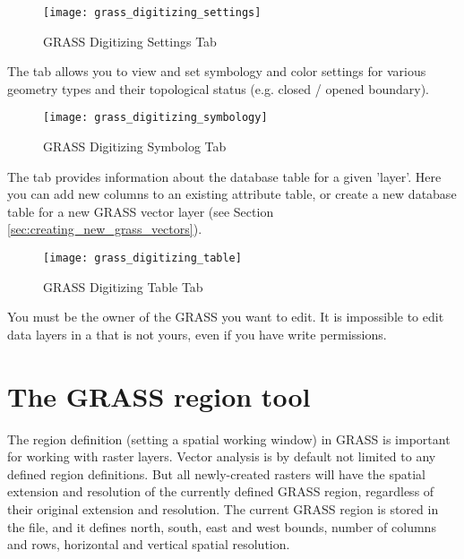 \begin{figure}[h]
 \centering
 \texttt{[image: grass\_digitizing\_settings]}
 \caption{GRASS Digitizing Settings Tab \nixcaption}\label{fig:grass_digitizing_settings}
\end{figure}


The  tab allows you to view and set symbology and color
settings for various geometry types and their topological status (e.g. closed
/ opened boundary).

\begin{figure}[h]
 \centering
 \texttt{[image: grass\_digitizing\_symbology]}
 \caption{GRASS Digitizing Symbolog Tab \nixcaption}\label{fig:grass_digitizing_symbology}
\end{figure}

 

The  tab provides information about the database table for
a given 'layer'. Here you can add new columns to an existing attribute table,
or create a new database table for a new GRASS vector layer (see Section 
\ref{sec:creating_new_grass_vectors}).

\begin{figure}[h]
 \centering
 \texttt{[image: grass\_digitizing\_table]}
 \caption{GRASS Digitizing Table Tab \nixcaption}\label{fig:grass_digitizing_table}
 \end{figure}

\begin{Tip}\caption{\textsc{GRASS Edit Permissions}}
You must be the owner of the GRASS  you want to 
edit. It is impossible to edit data layers in a  that is not 
yours, even if you have write permissions.
\end{Tip} 

\section{The GRASS region tool}\label{sec:grass_region}

The region definition (setting a spatial working window) in GRASS is important 
for working with raster layers. Vector analysis is by default not limited
to any defined region definitions. But all newly-created rasters will have the
spatial extension and resolution of the currently defined GRASS region,
regardless of their original extension and resolution. The current GRASS
region is stored in the  file, and it 
defines north, south, east and west bounds, number of columns and rows, 
horizontal and vertical spatial resolution.

